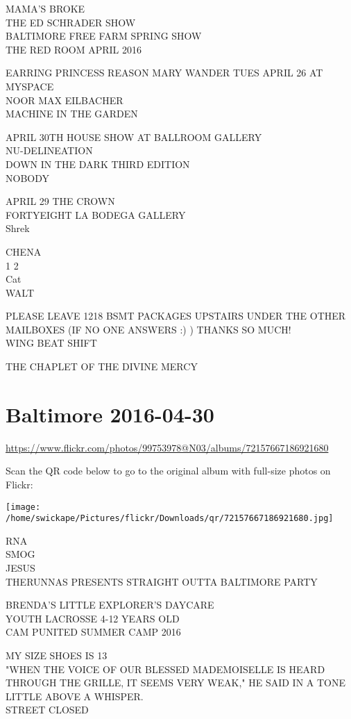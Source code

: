 \documentclass[10pt,letterpaper]{article}
\begin{document}
MAMA'S BROKE\\
THE ED SCHRADER SHOW\\
BALTIMORE FREE FARM SPRING SHOW\\
THE RED ROOM APRIL 2016

EARRING PRINCESS REASON MARY WANDER TUES APRIL 26 AT MYSPACE\\
NOOR MAX EILBACHER\\
MACHINE IN THE GARDEN

APRIL 30TH HOUSE SHOW AT BALLROOM GALLERY\\
NU{-}DELINEATION\\
DOWN IN THE DARK THIRD EDITION\\
NOBODY

APRIL 29 THE CROWN\\
FORTYEIGHT LA BODEGA GALLERY\\
Shrek

CHENA\\
1 2\\
Cat\\
WALT

PLEASE LEAVE 1218 BSMT PACKAGES UPSTAIRS UNDER THE OTHER MAILBOXES (IF NO ONE ANSWERS :) )  THANKS SO MUCH!\\
WING BEAT SHIFT

THE CHAPLET OF THE DIVINE MERCY
\pagebreak

\section*{Baltimore 2016-04-30}

\url{https://www.flickr.com/photos/99753978@N03/albums/72157667186921680}

Scan the QR code below to go to the original album with full-size photos on Flickr:

\texttt{[image: /home/swickape/Pictures/flickr/Downloads/qr/72157667186921680.jpg]}
\pagebreak

RNA\\
SMOG\\
JESUS\\
THERUNNAS PRESENTS STRAIGHT OUTTA BALTIMORE PARTY

BRENDA'S LITTLE EXPLORER'S DAYCARE\\
YOUTH LACROSSE 4{-}12 YEARS OLD\\
CAM PUNITED SUMMER CAMP 2016

MY SIZE SHOES IS 13\\
"WHEN THE VOICE OF OUR BLESSED MADEMOISELLE IS HEARD THROUGH THE GRILLE, IT SEEMS VERY WEAK," HE SAID IN A TONE LITTLE ABOVE A WHISPER.\\
STREET CLOSED
\end{document}
